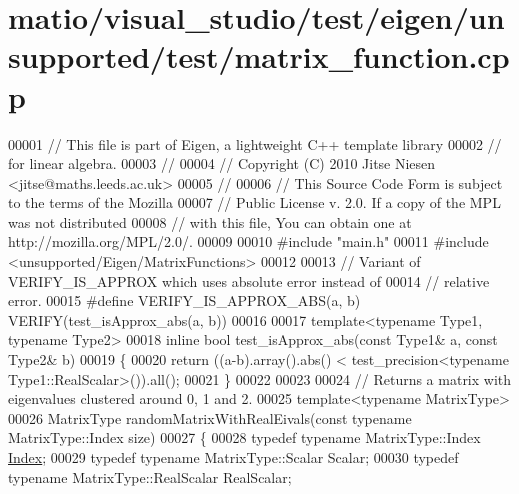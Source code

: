 \hypertarget{matio_2visual__studio_2test_2eigen_2unsupported_2test_2matrix__function_8cpp_source}{}\section{matio/visual\+\_\+studio/test/eigen/unsupported/test/matrix\+\_\+function.cpp}
\label{matio_2visual__studio_2test_2eigen_2unsupported_2test_2matrix__function_8cpp_source}

\begin{DoxyCode}
00001 \textcolor{comment}{// This file is part of Eigen, a lightweight C++ template library}
00002 \textcolor{comment}{// for linear algebra.}
00003 \textcolor{comment}{//}
00004 \textcolor{comment}{// Copyright (C) 2010 Jitse Niesen <jitse@maths.leeds.ac.uk>}
00005 \textcolor{comment}{//}
00006 \textcolor{comment}{// This Source Code Form is subject to the terms of the Mozilla}
00007 \textcolor{comment}{// Public License v. 2.0. If a copy of the MPL was not distributed}
00008 \textcolor{comment}{// with this file, You can obtain one at http://mozilla.org/MPL/2.0/.}
00009 
00010 \textcolor{preprocessor}{#include "main.h"}
00011 \textcolor{preprocessor}{#include <unsupported/Eigen/MatrixFunctions>}
00012 
00013 \textcolor{comment}{// Variant of VERIFY\_IS\_APPROX which uses absolute error instead of}
00014 \textcolor{comment}{// relative error.}
00015 \textcolor{preprocessor}{#define VERIFY\_IS\_APPROX\_ABS(a, b) VERIFY(test\_isApprox\_abs(a, b))}
00016 
00017 \textcolor{keyword}{template}<\textcolor{keyword}{typename} Type1, \textcolor{keyword}{typename} Type2>
00018 \textcolor{keyword}{inline} \textcolor{keywordtype}{bool} test\_isApprox\_abs(\textcolor{keyword}{const} Type1& a, \textcolor{keyword}{const} Type2& b)
00019 \{
00020   \textcolor{keywordflow}{return} ((a-b).array().abs() < test\_precision<typename Type1::RealScalar>()).all();
00021 \}
00022 
00023 
00024 \textcolor{comment}{// Returns a matrix with eigenvalues clustered around 0, 1 and 2.}
00025 \textcolor{keyword}{template}<\textcolor{keyword}{typename} MatrixType>
00026 MatrixType randomMatrixWithRealEivals(\textcolor{keyword}{const} \textcolor{keyword}{typename} MatrixType::Index size)
00027 \{
00028   \textcolor{keyword}{typedef} \textcolor{keyword}{typename} MatrixType::Index \hyperlink{namespace_eigen_a62e77e0933482dafde8fe197d9a2cfde}{Index};
00029   \textcolor{keyword}{typedef} \textcolor{keyword}{typename} MatrixType::Scalar Scalar;
00030   \textcolor{keyword}{typedef} \textcolor{keyword}{typename} MatrixType::RealScalar RealScalar;

\end{DoxyCode}
